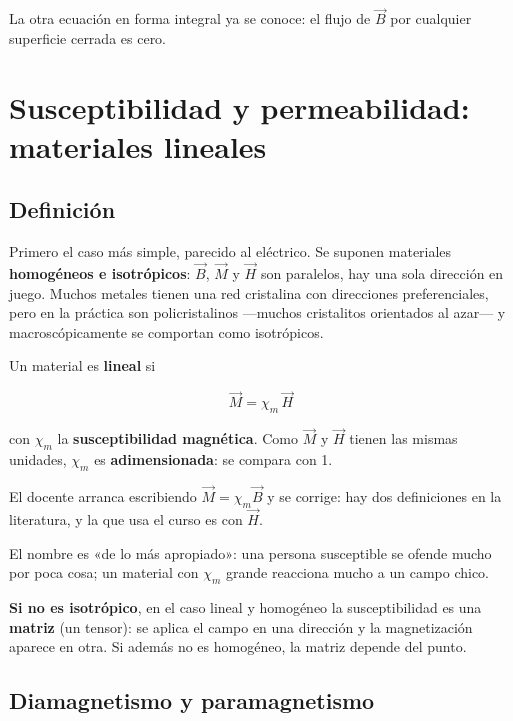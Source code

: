 \documentclass[12pt,a4paper]{article}
\begin{document}
La otra ecuación en forma integral ya se conoce: el flujo de $\vec B$ por
cualquier superficie cerrada es cero.

\section{Susceptibilidad y permeabilidad: materiales lineales}

\subsection{Definición}

Primero el caso más simple, parecido al eléctrico. Se suponen materiales
\textbf{homogéneos e isotrópicos}: $\vec B$, $\vec M$ y $\vec H$ son paralelos, hay
una sola dirección en juego. Muchos metales tienen una red cristalina con
direcciones preferenciales, pero en la práctica son policristalinos ---muchos
cristalitos orientados al azar--- y macroscópicamente se comportan como
isotrópicos.

Un material es \textbf{lineal} si

\begin{keybox}
\[
\boxed{\ \vec M = \chi_m\,\vec H\ }
\]
\end{keybox}
con $\chi_m$ la \textbf{susceptibilidad magnética}. Como $\vec M$ y $\vec H$ tienen
las mismas unidades, $\chi_m$ es \textbf{adimensionada}: se compara con 1.

\begin{notebox}
El docente arranca escribiendo $\vec M = \chi_m\vec B$ y se corrige: hay dos
definiciones en la literatura, y la que usa el curso es con $\vec H$.
\end{notebox}

El nombre es «de lo más apropiado»: una persona susceptible se ofende mucho
por poca cosa; un material con $\chi_m$ grande reacciona mucho a un campo
chico.

\begin{notebox}
\textbf{Si no es isotrópico}, en el caso lineal y homogéneo la susceptibilidad es
una \textbf{matriz} (un tensor): se aplica el campo en una dirección y la
magnetización aparece en otra. Si además no es homogéneo, la matriz depende
del punto.
\end{notebox}

\subsection{Diamagnetismo y paramagnetismo}
\end{document}
